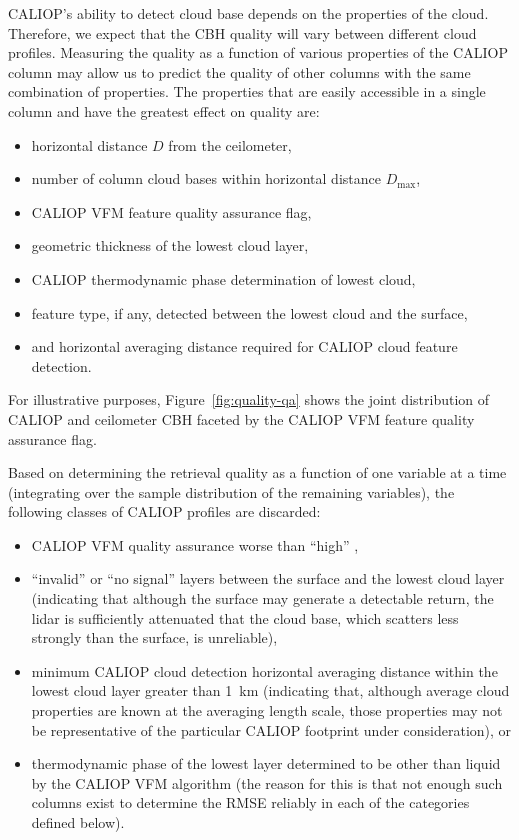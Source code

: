 \documentclass[essd,manuscript]{copernicus}\usepackage[]{graphicx}\usepackage[]{color}
\begin{document}
CALIOP's ability to detect cloud base depends on the properties of the cloud.
Therefore, we expect that the CBH quality will vary between
different cloud profiles.  Measuring the quality as a function of various
properties of the CALIOP column may allow us to predict the quality of other
columns with the same combination of properties.  The properties that are easily
accessible in a single column and have the greatest effect on quality are:
\begin{itemize}
\item horizontal distance $D$ from the ceilometer,
\item number of column cloud bases within horizontal distance $D_\text{max}$,
\item CALIOP VFM feature quality assurance flag,
\item geometric thickness of the lowest cloud layer,
\item CALIOP thermodynamic phase determination of lowest cloud,
\item feature type, if any, detected between the lowest cloud and the surface,
\item and horizontal averaging distance required for CALIOP cloud feature
  detection.
\end{itemize}
For illustrative purposes, Figure~\ref{fig:quality-qa} shows the joint
distribution of CALIOP and ceilometer CBH faceted by the CALIOP
VFM feature quality assurance flag.  

Based on determining the retrieval quality as a function of one variable at a
time (integrating over the sample distribution of the remaining variables), the
following classes of CALIOP profiles are discarded:
\begin{itemize}
\item CALIOP VFM quality assurance worse than ``high'' ,
\item ``invalid'' or ``no signal'' layers between the surface and the lowest
  cloud layer (indicating that although the surface may generate a detectable
  return, the lidar is sufficiently attenuated that the cloud base, which
  scatters less strongly than the surface, is unreliable),
\item minimum CALIOP cloud detection horizontal averaging distance within the
  lowest cloud layer greater than 1~km (indicating that, although average cloud
  properties are known at the averaging length scale, those properties may not
  be representative of the particular CALIOP footprint under consideration), or
\item thermodynamic phase of the lowest layer determined to be other than liquid
  by the CALIOP VFM algorithm (the reason for this is that not enough such
  columns exist to determine the RMSE reliably in each of the categories defined
  below).
\end{itemize}
\end{document}
